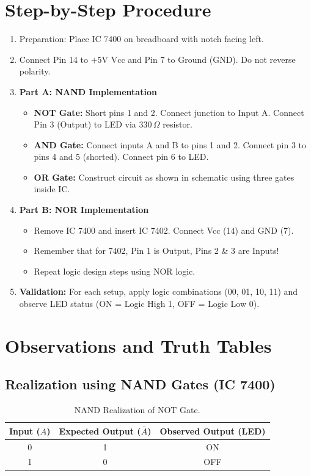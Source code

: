 \section{Step-by-Step Procedure}

\begin{enumerate}
    \item Preparation: Place IC 7400 on breadboard with notch facing left.
    \item Connect Pin 14 to $+5\text{V Vcc}$ and Pin 7 to Ground ($\text{GND}$). Do not reverse polarity.
    \item \textbf{Part A: NAND Implementation}
    \begin{itemize}
        \item \textbf{NOT Gate:} Short pins 1 and 2. Connect junction to Input A. Connect Pin 3 (Output) to LED via $330\,\Omega$ resistor.
        \item \textbf{AND Gate:} Connect inputs A and B to pins 1 and 2. Connect pin 3 to pins 4 and 5 (shorted). Connect pin 6 to LED.
        \item \textbf{OR Gate:} Construct circuit as shown in schematic using three gates inside IC.
    \end{itemize}
    \item \textbf{Part B: NOR Implementation}
    \begin{itemize}
        \item Remove IC 7400 and insert IC 7402. Connect Vcc (14) and GND (7).
        \item Remember that for 7402, Pin 1 is Output, Pins 2 \& 3 are Inputs!
        \item Repeat logic design steps using NOR logic.
    \end{itemize}
    \item \textbf{Validation:} For each setup, apply logic combinations (00, 01, 10, 11) and observe LED status (ON = Logic High 1, OFF = Logic Low 0).
\end{enumerate}

\section{Observations and Truth Tables}

\subsection{Realization using NAND Gates (IC 7400)}

\begin{table}[htbp]
\centering
\small
\begin{tabularx}{0.7\textwidth}{c c c}
\toprule
\textbf{Input ($A$)} & \textbf{Expected Output ($\bar{A}$)} & \textbf{Observed Output (LED)} \\
\midrule
0 & 1 & ON \\
1 & 0 & OFF \\
\bottomrule
\end{tabularx}
\caption{NAND Realization of NOT Gate.}
\label{tab:nand-not}
\end{table}

